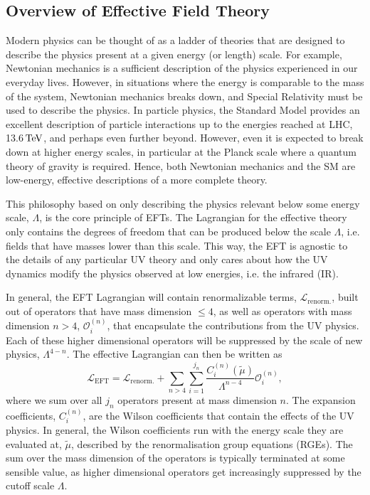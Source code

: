 \subsection{Overview of Effective Field Theory}

Modern physics can be thought of as a ladder of theories that are designed to describe the physics present at a given energy (or length) scale. For example, Newtonian mechanics is a sufficient description of the physics experienced in our everyday lives. However, in situations where the energy is comparable to the mass of the system, Newtonian mechanics breaks down, and Special Relativity must be used to describe the physics. In particle physics, the Standard Model provides an excellent description of particle interactions up to the energies reached at LHC, 13.6${\rm \,TeV}$, and perhaps even further beyond. However, even it is expected to break down at higher energy scales, in particular at the Planck scale where a quantum theory of gravity is required. Hence, both Newtonian mechanics and the SM are low-energy, effective descriptions of a more complete theory.

This philosophy based on only describing the physics relevant below some energy scale, $\Lambda$, is the core principle of EFTs. The Lagrangian for the effective theory only contains the degrees of freedom that can be produced below the scale $\Lambda$, i.e. fields that have masses lower than this scale. This way, the EFT is agnostic to the details of any particular UV theory and only cares about how the UV dynamics modify the physics observed at low energies, i.e. the infrared (IR).

In general, the EFT Lagrangian will contain renormalizable terms, $\mathcal{L}_\mathrm{renorm.}$,  built out of operators that have mass dimension $\leq 4$, as well as operators with mass dimension $n> 4$, $\mathcal{O}_i^{(n)}$, that encapsulate the contributions from the UV physics. Each of these higher dimensional operators will be suppressed by the scale of new physics, $\Lambda^{4-n}$. 
The effective Lagrangian can then be written as
\begin{equation}
    \mathcal{L}_\mathrm{EFT} = \mathcal{L}_\mathrm{renorm.} +  \sum_{n>4}   \sum_{i = 1}^{j_n} \frac{C_i^{(n)} (\tilde{\mu})}{\Lambda^{n-4}}\mathcal{O}_i^{(n)},
    \label{eq:EFT_Lagrangian}
\end{equation}
where we sum over all $j_n$ operators present at mass dimension $n$. The expansion coefficients, $C_i^{(n)}$, are the Wilson coefficients that contain the effects of the UV physics. In general, the Wilson coefficients run with the energy scale they are evaluated at, $\tilde{\mu}$, described by the renormalisation group equations (RGEs).
The sum over the mass dimension of the operators is typically terminated at some sensible value, as higher dimensional operators get increasingly suppressed by the cutoff scale $\Lambda$.

